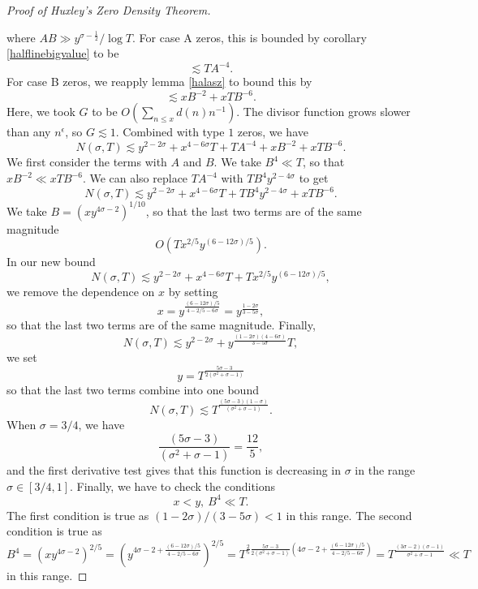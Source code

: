 \begin{proof}[Proof of Huxley's Zero Density Theorem]
\begin{enumerate}[label=(\alph*)]
    \end{enumerate}
    where $AB\gg y^{\sigma-\frac{1}{2}}/\log T$. For case A zeros, this is bounded by corollary \ref{halflinebigvalue} to be \[
        \lesssim TA^{-4}.
    \]
    For case B zeros, we reapply lemma \ref{halasz} to bound this by \[
    \lesssim xB^{-2}+xTB^{-6}.
    \]Here, we took $G$ to be $O(\sum_{n\leq x} d(n)n^{-1})$. The divisor function grows slower than any $n^\epsilon$, so $G\lesssim 1$. Combined with type $1$ zeros, we have\[
    N(\sigma, T)\lesssim y^{2-2\sigma} + x^{4-6\sigma}T+TA^{-4}+xB^{-2}+xTB^{-6}.
    \]
    We first consider the terms with $A$ and $B$. We take $B^4\ll T$, so that $xB^{-2} \ll xTB^{-6}$. We can also replace $TA^{-4}$ with $TB^4y^{2-4\sigma}$ to get \[
    N(\sigma, T)\lesssim y^{2-2\sigma} + x^{4-6\sigma}T+TB^4y^{2-4\sigma}+xTB^{-6}.
    \]
    We take $B=(xy^{4\sigma-2})^{1/10}$, so that the last two terms are of the same magnitude \[
    O(Tx^{2/5}y^{(6-12\sigma)/5}).
    \]In our new bound \[
    N(\sigma, T)\lesssim y^{2-2\sigma} + x^{4-6\sigma}T+Tx^{2/5}y^{(6-12\sigma)/5},
    \]
    we remove the dependence on $x$ by setting \[
    x=y^{\frac{(6-12\sigma)/5}{4-2/5 - 6\sigma}}=y^{\frac{1-2\sigma}{3-5\sigma}},
    \]
    so that the last two terms are of the same magnitude.
    Finally, \[
    N(\sigma, T)\lesssim y^{2-2\sigma} + y^{\frac{(1-2\sigma)(4-6\sigma)}{3-5\sigma}}T,
    \]
    we set \[
    y=T^{\frac{5\sigma-3}{2(\sigma^2+\sigma-1)}}
    \] so that the last two terms combine into one bound\[
        N(\sigma, T)\lesssim T^{\frac{(5\sigma-3)(1-\sigma)}{(\sigma^2+\sigma-1)}}.
    \]
    When $\sigma=3/4$, we have \[
        \frac{(5\sigma-3)}{(\sigma^2+\sigma-1)}=\frac{12}{5},
    \]
    and the first derivative test gives that this function is decreasing in $\sigma$ in the range $\sigma\in [3/4,1]$.
    Finally, we have to check the conditions \[
    x<y,\ B^4\ll T.
    \]
    The first condition is true as $(1-2\sigma)/(3-5\sigma) < 1$ in this range. The second condition is true as \[
    B^4=(xy^{4\sigma-2})^{2/5}=(y^{4\sigma-2+\frac{(6-12\sigma)/5}{4-2/5 - 6\sigma}})^{2/5}= T^{\frac{2}{5}\frac{5\sigma-3}{2(\sigma^2+\sigma-1)}(4\sigma-2+\frac{(6-12\sigma)/5}{4-2/5 - 6\sigma})}= T^{\frac{(3\sigma-2)(\sigma-1)}{\sigma^2+\sigma-1}}\ll T
    \] in this range.
\end{proof}
